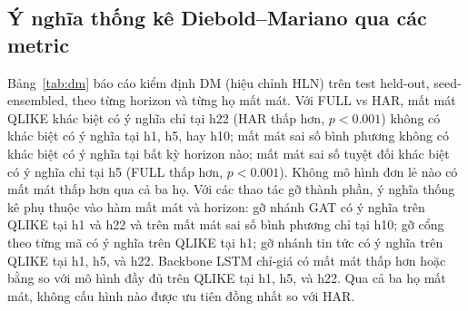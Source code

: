 \documentclass[runningheads]{llncs}
\begin{document}
\subsection{Ý nghĩa thống kê Diebold--Mariano qua các metric}
\label{sec:dm}
Bảng~\ref{tab:dm} báo cáo kiểm định DM (hiệu chỉnh HLN) trên test held-out, seed-ensembled, theo từng
horizon và từng họ mất mát. Với FULL vs HAR, mất mát QLIKE khác biệt có ý nghĩa chỉ tại h22 (HAR thấp
hơn, $p<0.001$) không có khác biệt có ý nghĩa tại h1, h5, hay h10; mất mát sai số bình phương không có
khác biệt có ý nghĩa tại bất kỳ horizon nào; mất mát sai số tuyệt đối khác biệt có ý nghĩa chỉ tại h5
(FULL thấp hơn, $p<0.001$). Không mô hình đơn lẻ nào có mất mát thấp hơn qua cả ba họ. Với các thao tác
gỡ thành phần, ý nghĩa thống kê phụ thuộc vào hàm mất mát và horizon: gỡ nhánh GAT có ý nghĩa trên QLIKE
tại h1 và h22 và trên mất mát sai số bình phương chỉ tại h10; gỡ cổng theo từng mã có ý nghĩa trên QLIKE
tại h1; gỡ nhánh tin tức có ý nghĩa trên QLIKE tại h1, h5, và h22. Backbone LSTM chỉ-giá có mất mát thấp
hơn hoặc bằng so với mô hình đầy đủ trên QLIKE tại h1, h5, và h22. Qua cả ba họ mất mát, không cấu hình
nào được ưu tiên đồng nhất so với HAR.
\end{document}
